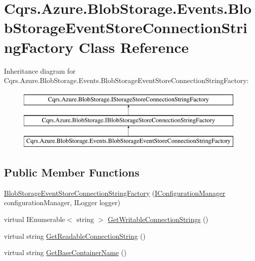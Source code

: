 \hypertarget{classCqrs_1_1Azure_1_1BlobStorage_1_1Events_1_1BlobStorageEventStoreConnectionStringFactory}{}\section{Cqrs.\+Azure.\+Blob\+Storage.\+Events.\+Blob\+Storage\+Event\+Store\+Connection\+String\+Factory Class Reference}
\label{classCqrs_1_1Azure_1_1BlobStorage_1_1Events_1_1BlobStorageEventStoreConnectionStringFactory}
Inheritance diagram for Cqrs.\+Azure.\+Blob\+Storage.\+Events.\+Blob\+Storage\+Event\+Store\+Connection\+String\+Factory\+:\begin{figure}[H]
\begin{center}
\leavevmode
\includegraphics[height=3.000000cm]{classCqrs_1_1Azure_1_1BlobStorage_1_1Events_1_1BlobStorageEventStoreConnectionStringFactory}
\end{center}
\end{figure}
\subsection*{Public Member Functions}
\begin{DoxyCompactItemize}
\item 
\hyperlink{classCqrs_1_1Azure_1_1BlobStorage_1_1Events_1_1BlobStorageEventStoreConnectionStringFactory_a6ace1481cc61d75f5d472e374566e477}{Blob\+Storage\+Event\+Store\+Connection\+String\+Factory} (\hyperlink{interfaceCqrs_1_1Configuration_1_1IConfigurationManager}{I\+Configuration\+Manager} configuration\+Manager, I\+Logger logger)
\item 
virtual I\+Enumerable$<$ string $>$ \hyperlink{classCqrs_1_1Azure_1_1BlobStorage_1_1Events_1_1BlobStorageEventStoreConnectionStringFactory_a002b45d6a893b1b3024b0e7c97f1c9ac}{Get\+Writable\+Connection\+Strings} ()
\item 
virtual string \hyperlink{classCqrs_1_1Azure_1_1BlobStorage_1_1Events_1_1BlobStorageEventStoreConnectionStringFactory_aa47606e4cd5a71437bed71e07fda53ed}{Get\+Readable\+Connection\+String} ()
\item 
virtual string \hyperlink{classCqrs_1_1Azure_1_1BlobStorage_1_1Events_1_1BlobStorageEventStoreConnectionStringFactory_a0e6aadced9c9a583884899a4c9de2f1a}{Get\+Base\+Container\+Name} ()
\end{DoxyCompactItemize}
